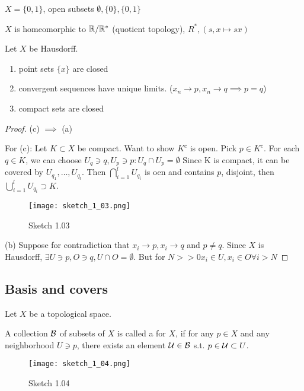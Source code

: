 \begin{example}
    \(X=\{0,1\}\), open subsets \(\emptyset,\{0\},\{0,1\}\)
\end{example}

\begin{remark}
    \(X\) is homeomorphic to \(\mathbb{R}/\mathbb{R}^*\) (quotient topology), \(R^*, (s,x\mapsto sx)\)
\end{remark}


\begin{lemma}\label{lem:1.2}
    Let \(X\) be Hausdorff. 
    \begin{enumerate}
        \item[(a)] point sets \(\{x\}\) are closed
        \item[(b)] convergent sequences have unique limits. (\(x_n\to p,x_n\to q\implies p=q\)) 
        \item[(c)] compact sets are closed 
    \end{enumerate}
\end{lemma}

\begin{proof}
    (c) \(\implies \) (a)

    For (c): Let \(K\subset X\) be compact. Want to show \(K^c\) is open. Pick \(p\in K^c\). For each 
    \(q\in K\), we can choose \(U_q\ni q, U_p\ni p: U_q\cap U_p=\emptyset\) Since K is compact, it can be covered by \(U_{q_1},\dots,U_{q_l}\). Then \(\bigcap_{i=1}^l U_{q_i}\) is oen and contains 
    \(p\), disjoint, then \(\bigcup_{i=1}^l U_{q_i}\supset K\).

    \begin{figure}[H]
        \centering
        \texttt{[image: sketch\_1\_03.png]}
        \caption{Sketch 1.03}
    \end{figure}

    (b) Suppose for contradiction that \(x_i\to p,x_i\to q\) and \(p\neq q\). Since \(X\) is Hausdorff, \(\exists U\ni p, O\ni q, U\cap O=\emptyset\). But for \(N>>0 x_i\in U, x_i\in O\forall i>N\)
\end{proof}


\subsection{Basis and covers}

Let \(X\) be a topological space.

\begin{definition*}
    A collection \(\mathcal{B}\) of subsets of \(X\) is called a  for \(X\), if for any \(p\in X\)
    and any neighborhood \(U\ni p\), there exists an element \(\mathcal{U}\in\mathcal{B}\) s.t. \(p\in \mathcal{U}\subset U\).
    \begin{figure}[H]
        \centering
        \texttt{[image: sketch\_1\_04.png]}
        \caption{Sketch 1.04}
    \end{figure}
\end{definition*}


